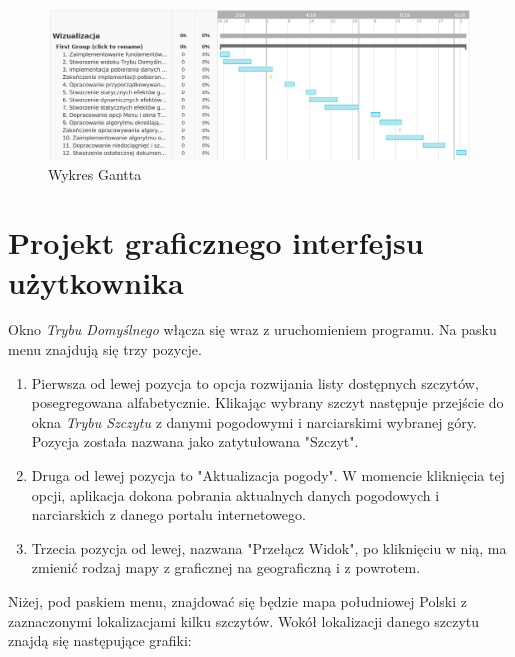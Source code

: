 \documentclass[10pt, a4paper]{article}
\begin{document}
	\begin{figure}[h]
	\centering
	\includegraphics[width=\linewidth]{gantt.png}
	\caption{Wykres Gantta}
	\end{figure}
\section{Projekt graficznego interfejsu użytkownika} 
	\begin{flushleft}
	Okno \textit{Trybu Domyślnego} włącza się wraz z uruchomieniem programu. Na pasku menu znajdują się trzy pozycje. \\
	\end{flushleft}
\begin{enumerate}
\item Pierwsza od lewej pozycja to opcja rozwijania listy dostępnych szczytów, posegregowana alfabetycznie. Klikając wybrany szczyt następuje przejście do okna \textit{Trybu Szczytu} z danymi pogodowymi i narciarskimi wybranej góry. Pozycja została nazwana jako zatytułowana "Szczyt". \\
\item Druga od lewej pozycja to "Aktualizacja pogody". W momencie kliknięcia tej opcji, aplikacja dokona pobrania aktualnych danych pogodowych i narciarskich z danego portalu internetowego. \\
\item Trzecia pozycja od lewej, nazwana "Przełącz Widok", po kliknięciu w nią, ma zmienić rodzaj mapy z graficznej na geograficzną i z powrotem.  \\
\end{enumerate}
	\begin{flushleft}
	Niżej, pod paskiem menu, znajdować się będzie mapa południowej Polski z zaznaczonymi lokalizacjami kilku szczytów. Wokół lokalizacji danego szczytu znajdą się następujące grafiki:\\
	\end{flushleft}
\end{document}
